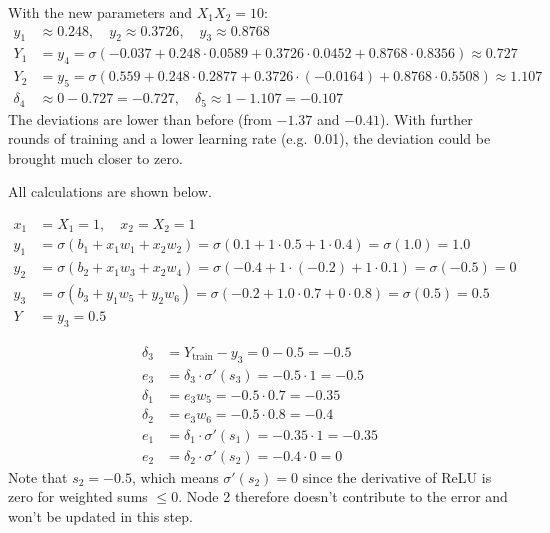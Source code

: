 With the new parameters and $X_1X_2 = 10$:
\begin{align*}
  y_1 &\approx 0.248, \quad y_2 \approx 0.3726, \quad y_3 \approx 0.8768 \\
  Y_1 &= y_4 = \sigma(-0.037 + 0.248 \cdot 0.0589 + 0.3726 \cdot 0.0452 + 0.8768 \cdot 0.8356)
    \approx 0.727 \\
  Y_2 &= y_5 = \sigma(0.559 + 0.248 \cdot 0.2877 + 0.3726 \cdot (-0.0164) + 0.8768 \cdot 0.5508)
    \approx 1.107 \\
  \delta_4 &\approx 0 - 0.727 = -0.727, \quad \delta_5 \approx 1 - 1.107 = -0.107
\end{align*}
The deviations are lower than before (from $-1.37$ and $-0.41$). With further rounds of training and
a lower learning rate (e.g.\ 0.01), the deviation could be brought much closer to zero.

All calculations are shown below.

\begin{align*}
  x_1 &= X_1 = 1, \quad x_2 = X_2 = 1 \\
  y_1 &= \sigma(b_1 + x_1 w_1 + x_2 w_2) = \sigma(0.1 + 1 \cdot 0.5 + 1 \cdot 0.4) = \sigma(1.0)
    = 1.0 \\
  y_2 &= \sigma(b_2 + x_1 w_3 + x_2 w_4) = \sigma(-0.4 + 1 \cdot (-0.2) + 1 \cdot 0.1)
    = \sigma(-0.5) = 0 \\
  y_3 &= \sigma(b_3 + y_1 w_5 + y_2 w_6) = \sigma(-0.2 + 1.0 \cdot 0.7 + 0 \cdot 0.8)
    = \sigma(0.5) = 0.5 \\
  Y &= y_3 = 0.5
\end{align*}

\begin{align*}
  \delta_3 &= Y_{\mathrm{train}} - y_3 = 0 - 0.5 = -0.5 \\
  e_3 &= \delta_3 \cdot \sigma'(s_3) = -0.5 \cdot 1 = -0.5 \\
  \delta_1 &= e_3 w_5 = -0.5 \cdot 0.7 = -0.35 \\
  \delta_2 &= e_3 w_6 = -0.5 \cdot 0.8 = -0.4 \\
  e_1 &= \delta_1 \cdot \sigma'(s_1) = -0.35 \cdot 1 = -0.35 \\
  e_2 &= \delta_2 \cdot \sigma'(s_2) = -0.4 \cdot 0 = 0
\end{align*}
Note that $s_2 = -0.5$, which means $\sigma'(s_2) = 0$ since the derivative of ReLU is zero for
weighted sums $\leq 0$. Node 2 therefore doesn't contribute to the error and won't be updated in
this step.

